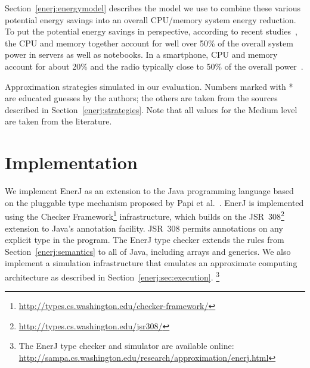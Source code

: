 \medskip
\noindent
Section~\ref{enerj:energymodel} describes the model we use to combine these
various potential energy savings into an overall CPU/memory system energy
reduction.
To put the potential energy savings in perspective, according to
recent studies~\cite{googlepower, aqeel}, the CPU and memory together account
for well over 50\% of the overall system power in servers as well as
notebooks. In a smartphone, CPU and memory account for about 20\% and
the radio typically close to 50\% of the overall
power~\cite{carroll2010}.






\begin{table}
\small
\begin{centering}

\end{centering}
\caption{Approximation strategies simulated in our evaluation.
Numbers marked with * are educated guesses by the authors; the others
are taken from the sources described in Section~\ref{enerj:strategies}. Note that
all values for the Medium level are taken from the literature.}
\label{enerj:table:approximations}
\end{table}




\section{Implementation}
\label{enerj:sec:impl}

We implement EnerJ as an extension to the Java
programming language based on the
pluggable type mechanism proposed by Papi et al.~\cite{pap2008}.
EnerJ is implemented using the
Checker Framework\footnote{\url{http://types.cs.washington.edu/checker-framework/}}
infrastructure,
which builds on the
JSR~308\footnote{\url{http://types.cs.washington.edu/jsr308/}}
extension to Java's annotation facility. JSR~308 permits annotations on
any explicit type in the program.
The EnerJ type checker extends the rules from Section~\ref{enerj:semantics} to all of
Java, including arrays and generics.
We also implement a simulation infrastructure that emulates an
approximate computing architecture as described in Section~\ref{enerj:sec:execution}.
\footnote{The EnerJ type checker and simulator
are available online:
\url{http://sampa.cs.washington.edu/research/approximation/enerj.html}
}

